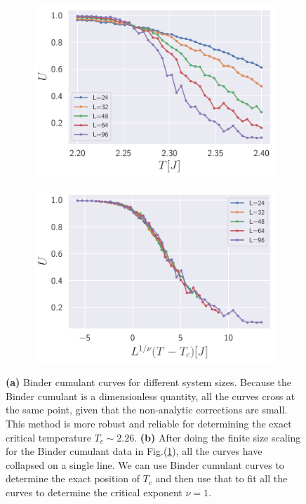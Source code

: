 \begin{figure}[H]
	\centering
	\begin{subfigure}[c]{0.5\textwidth}
		\centering
		\includegraphics[width=\textwidth]{figures/introduction/Ising2DBinder.pdf}
		\caption{}
		\label{gr:2DIsingBinder}
	\end{subfigure}%
	\begin{subfigure}[c]{0.5\textwidth}
		\centering
		\includegraphics[width=\textwidth]{figures/introduction/Ising2DBinderCollapse.pdf}
		\caption{}
		\label{gr:2DIsingBinderCollaps}
	\end{subfigure}
	\caption{\textbf{(a)} Binder cumulant curves for different system sizes. Because the Binder cumulant is a dimensionless quantity, all the curves cross at the same point, given that the non-analytic corrections are small. This method is more robust and reliable for determining the exact critical temperature $T_c \sim 2.26$. \textbf{(b)} After doing the finite size scaling for the Binder cumulant data in Fig.(\ref{gr:2DIsingBinder}), all the curves have collapsed on a single line. We can use Binder cumulant curves to determine the exact position of $T_c$ and then use that to fit all the curves to determine the critical exponent $\nu=1$.}
\end{figure}
